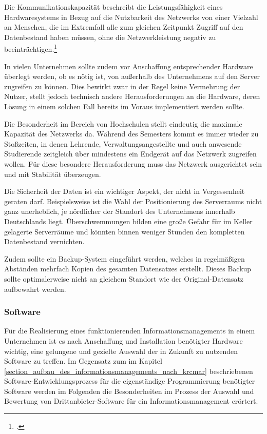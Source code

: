 Die Kommunikationskapazität beschreibt die Leistungsfähigkeit eines Hardwaresystems in Bezug auf 
die Nutzbarkeit des Netzwerks von einer Vielzahl an Menschen, die im Extremfall alle zum gleichen 
Zeitpunkt Zugriff auf den Datenbestand haben müssen, ohne die Netzwerkleistung negativ zu 
beeinträchtigen.\footcite{krcmar_einfuhrung_2015}

In vielen Unternehmen sollte zudem vor Anschaffung entsprechender Hardware überlegt werden, ob 
es nötig ist, von außerhalb des Unternehmens auf den Server zugreifen zu können. Dies bewirkt 
zwar in der Regel keine Vermehrung der Nutzer, stellt jedoch technisch andere Herausforderungen 
an die Hardware, deren Lösung in einem solchen Fall bereits im Voraus implementiert werden sollte.

Die Besonderheit im Bereich von Hochschulen stellt eindeutig die maximale Kapazität des Netzwerks 
da. Während des Semesters kommt es immer wieder zu Stoßzeiten, in denen Lehrende, 
Verwaltungsangestellte und auch anwesende Studierende zeitgleich über mindestens ein Endgerät 
auf das Netzwerk zugreifen wollen. Für diese besondere Herausforderung muss das Netzwerk 
ausgerichtet sein und mit Stabilität überzeugen.

Die Sicherheit der Daten ist ein wichtiger Aspekt, der nicht in Vergessenheit geraten darf. 
Beispielsweise ist die Wahl der Positionierung des Serverraums nicht ganz unerheblich, je nördlicher 
der Standort des Unternehmens innerhalb Deutschlands liegt. Überschwemmungen bilden eine große 
Gefahr für im Keller gelagerte Serverräume und könnten binnen weniger Stunden den kompletten 
Datenbestand vernichten.

Zudem sollte ein Backup-System eingeführt werden, welches in regelmäßigen Abständen mehrfach 
Kopien des gesamten Datensatzes erstellt. Dieses Backup sollte optimalerweise nicht an gleichem 
Standort wie der Original-Datensatz aufbewahrt werden.

\subsubsection{Software}
Für die Realisierung eines funktionierenden Informationsmanagements in einem Unternehmen ist es 
nach Anschaffung und Installation benötigter Hardware wichtig, eine gelungene und gezielte Auswahl 
der in Zukunft zu nutzenden Software zu treffen. Im Gegensatz zum im Kapitel 
\ref{section_aufbau_des_informationsmanagements_nach_krcmar} beschriebenen 
Software-Entwicklungsprozess für die eigenständige Programmierung benötigter Software werden im 
Folgenden die Besonderheiten im Prozess der Auswahl und Bewertung von Drittanbieter-Software für 
ein Informationsmanagement erörtert.

